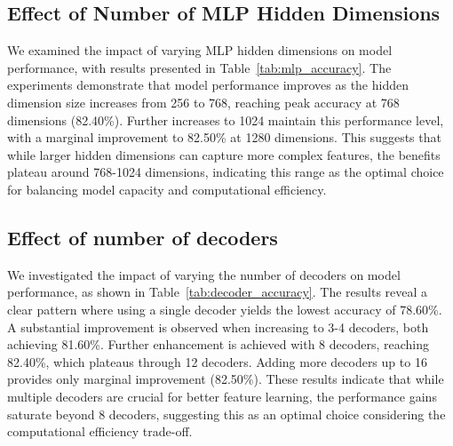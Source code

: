 \subsection{Effect of Number of MLP Hidden Dimensions}

We examined the impact of varying MLP hidden dimensions on model performance, with results presented in Table~\ref{tab:mlp_accuracy}. The experiments demonstrate that model performance improves as the hidden dimension size increases from 256 to 768, reaching peak accuracy at 768 dimensions (82.40\%). Further increases to 1024 maintain this performance level, with a marginal improvement to 82.50\% at 1280 dimensions. This suggests that while larger hidden dimensions can capture more complex features, the benefits plateau around 768-1024 dimensions, indicating this range as the optimal choice for balancing model capacity and computational efficiency.

\begin{table}[htbp]
    \centering
    \caption{Accuracy results for different MLP hidden dimensions}
    \label{tab:mlp_accuracy}
\end{table}

\subsection{Effect of number of decoders}

We investigated the impact of varying the number of decoders on model performance, as shown in Table~\ref{tab:decoder_accuracy}. The results reveal a clear pattern where using a single decoder yields the lowest accuracy of 78.60\%. A substantial improvement is observed when increasing to 3-4 decoders, both achieving 81.60\%. Further enhancement is achieved with 8 decoders, reaching 82.40\%, which plateaus through 12 decoders. Adding more decoders up to 16 provides only marginal improvement (82.50\%). These results indicate that while multiple decoders are crucial for better feature learning, the performance gains saturate beyond 8 decoders, suggesting this as an optimal choice considering the computational efficiency trade-off.

\begin{table}[htbp]
    \centering
    \caption{Accuracy results for different decoder sizes}
    \label{tab:decoder_accuracy}
\end{table}
